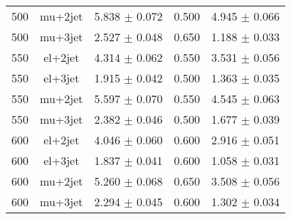 \begin{table}
\begin{center}
{\begin{tabular}{l|c|c|c|c}
500 & mu+2jet  &   5.838 $\pm$ 0.072   &  0.500   &   4.945 $\pm$ 0.066  \\
500 & mu+3jet  &   2.527 $\pm$ 0.048   &  0.650   &   1.188 $\pm$ 0.033  \\
\hline
550 & el+2jet  &   4.314 $\pm$ 0.062   &  0.550   &   3.531 $\pm$ 0.056  \\
550 & el+3jet  &   1.915 $\pm$ 0.042   &  0.500   &   1.363 $\pm$ 0.035  \\
550 & mu+2jet  &   5.597 $\pm$ 0.070   &  0.550   &   4.545 $\pm$ 0.063  \\
550 & mu+3jet  &   2.382 $\pm$ 0.046   &  0.500   &   1.677 $\pm$ 0.039  \\
\hline
600 & el+2jet  &   4.046 $\pm$ 0.060   &  0.600   &   2.916 $\pm$ 0.051  \\
600 & el+3jet  &   1.837 $\pm$ 0.041   &  0.600   &   1.058 $\pm$ 0.031  \\
600 & mu+2jet  &   5.260 $\pm$ 0.068   &  0.650   &   3.508 $\pm$ 0.056  \\
600 & mu+3jet  &   2.294 $\pm$ 0.045   &  0.600   &   1.302 $\pm$ 0.034  \\
\hline
    \end{tabular}
}
  \end{center}
\end{table}
